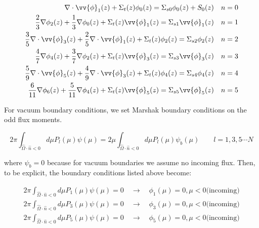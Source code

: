 \documentclass[10pt]{article}
\begin{document}
\begin{equation}
\begin{aligned}
\nabla\cdot\vv{\phi}_{1}(z)+ \Sigma_t(z)\phi_0(z)=\Sigma_{s0}\phi_0(z)+ S_0(z)\quad n=0\\
\frac{2}{3}\nabla\phi_{2}(z)+\frac{1}{3}\nabla\phi_{0}(z)+ \Sigma_t(z)\vv{\phi}_1(z)=\Sigma_{s1}\vv{\phi}_1(z)\quad n=1\\
\frac{3}{5}\nabla\cdot\vv{\phi}_{3}(z)+\frac{2}{5}\nabla\cdot\vv{\phi}_{1}(z)+ \Sigma_t(z)\phi_2(z)=\Sigma_{s2}\phi_2(z)\quad n=2\\
\frac{4}{7}\nabla\phi_{4}(z)+\frac{3}{7}\nabla\phi_{2}(z)+ \Sigma_t(z)\vv{\phi}_3(z)=\Sigma_{s3}\vv{\phi}_3(z)\quad n=3\\
\frac{5}{9}\nabla\cdot\vv{\phi}_{5}(z)+\frac{4}{9}\nabla\cdot\vv{\phi}_{3}(z)+ \Sigma_t(z)\phi_4(z)=\Sigma_{s4}\phi_4(z)\quad n=4\\
\frac{6}{11}\nabla\phi_{6}(z)+\frac{5}{11}\nabla\phi_{4}(z)+ \Sigma_t(z)\vv{\phi}_5(z)=\Sigma_{s5}\vv{\phi}_5(z)\quad n=5\\
\end{aligned}
\end{equation}

For vacuum boundary conditions, we set Marshak boundary conditions on the odd flux moments. 

\begin{equation}
2\pi\int_{\hat{\Omega}\cdot\hat{n}<0}^{}d\mu P_l(\mu)\psi(\mu)=2\mu\int_{\hat{\Omega}\cdot\hat{n}<0}^{}d\mu P_l(\mu)\psi_b(\mu)\quad\quad l=1, 3, 5\cdots N
\end{equation}

where \(\psi_b=0\) because for vacuum boundaries we assume no incoming flux. Then, to be explicit, the boundary conditions listed above become:

\begin{equation}
\begin{aligned}
2\pi\int_{\hat{\Omega}\cdot\hat{n}<0}^{}d\mu P_1(\mu)\psi(\mu)=0\quad\rightarrow\quad \phi_1(\mu)=0, \mu<0 \textrm{(incoming)}\\
2\pi\int_{\hat{\Omega}\cdot\hat{n}<0}^{}d\mu P_3(\mu)\psi(\mu)=0\quad\rightarrow\quad \phi_3(\mu)=0, \mu<0 \textrm{(incoming)}\\
2\pi\int_{\hat{\Omega}\cdot\hat{n}<0}^{}d\mu P_5(\mu)\psi(\mu)=0\quad\rightarrow\quad \phi_5(\mu)=0, \mu<0 \textrm{(incoming)}\\
\end{aligned}
\end{equation}
\end{document}

